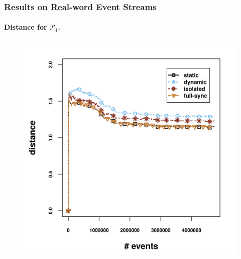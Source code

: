\begin{frame}
	
	\frametitle{Results on Real-word Event Streams }
	\framesubtitle{Distance for $\mathcal{P}_1$.}
	
	\begin{center}
		\centering
		\begin{figure}[]
			
			\includegraphics[width=.9\textwidth,height=.8\textheight]{../chapters/figures/synopses/new/distance_p1.png}
			
		\end{figure}
	\end{center}
	
\end{frame}

